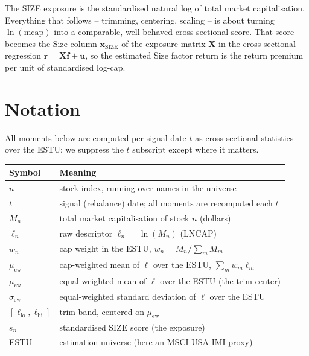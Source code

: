 \documentclass[11pt]{article}
\theoremstyle{definition}
\theoremstyle{plain}
\theoremstyle{remark}
\newcommand{\Xmat}{\mathbf{X}}
\newcommand{\fvec}{\mathbf{f}}
\begin{document}
\begin{keyresult}
The SIZE exposure is the standardised natural log of total market capitalisation. Everything that follows -- trimming, centering, scaling -- is about turning $\ln(\text{mcap})$ into a comparable, well-behaved cross-sectional score. That score becomes the Size column $\mathbf{x}_{\mathrm{SIZE}}$ of the exposure matrix $\Xmat$ in the cross-sectional regression $\mathbf{r}=\Xmat\fvec+\mathbf{u}$, so the estimated Size factor return is the return premium per unit of standardised log-cap.
\end{keyresult}

\section*{Notation}

All moments below are computed per signal date $t$ as cross-sectional statistics over the ESTU; we suppress the $t$ subscript except where it matters.

\begin{center}
\begin{tabular}{ll}
\toprule
Symbol & Meaning \\
\midrule
$n$ & stock index, running over names in the universe \\
$t$ & signal (rebalance) date; all moments are recomputed each $t$ \\
$M_n$ & total market capitalisation of stock $n$ (dollars) \\
$\ell_n$ & raw descriptor $\ell_n = \ln(M_n)$ (LNCAP) \\
$w_n$ & cap weight in the ESTU, $w_n = M_n / \sum_m M_m$ \\
$\mu_{\mathrm{cw}}$ & cap-weighted mean of $\ell$ over the ESTU, $\sum_m w_m \ell_m$ \\
$\mu_{\mathrm{ew}}$ & equal-weighted mean of $\ell$ over the ESTU (the trim center) \\
$\sigma_{\mathrm{ew}}$ & equal-weighted standard deviation of $\ell$ over the ESTU \\
$[\ell_{\mathrm{lo}},\ell_{\mathrm{hi}}]$ & trim band, centered on $\mu_{\mathrm{ew}}$ \\
$s_n$ & standardised SIZE score (the exposure) \\
ESTU & estimation universe (here an MSCI USA IMI proxy) \\
\bottomrule
\end{tabular}
\end{center}
\end{document}
